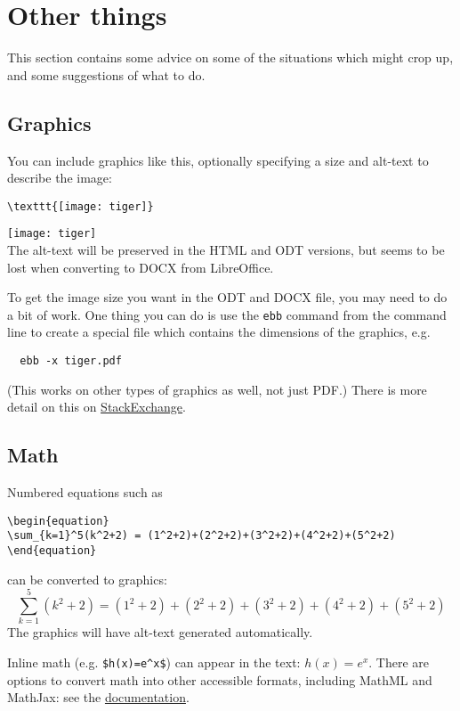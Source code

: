 \documentclass[a4paper,12pt]{article}
\begin{document}
\section{Other things}

This section contains some advice on some of the situations which
might crop up, and some suggestions of what to do.

\subsection{Graphics}

You can include graphics like this, optionally specifying a size and
alt-text to describe the image:
\begin{verbatim}
\texttt{[image: tiger]}  
\end{verbatim}
\texttt{[image: tiger]}\\
The alt-text will be preserved in the HTML and ODT versions, but seems
to be lost when converting to DOCX from LibreOffice.

To get the image size you want in the ODT and DOCX file, you may need
to do a bit of work. One thing you can do is use the \verb!ebb!
command from the command line to create a special file which contains
the dimensions of the graphics, e.g.
\begin{verbatim}
  ebb -x tiger.pdf
\end{verbatim}
(This works on other types of graphics as well, not just PDF.)  There
is more detail on this on
\href{https://tex.stackexchange.com/a/568853/110494}{StackExchange}.

\subsection{Math}

Numbered equations such as
\begin{verbatim}
\begin{equation}
\sum_{k=1}^5(k^2+2) = (1^2+2)+(2^2+2)+(3^2+2)+(4^2+2)+(5^2+2)
\end{equation}
\end{verbatim}
can be converted to graphics:
\begin{equation}
\sum_{k=1}^5(k^2+2) = (1^2+2)+(2^2+2)+(3^2+2)+(4^2+2)+(5^2+2)
\end{equation}
The graphics will have alt-text generated automatically.

Inline math (e.g. \verb!$h(x)=e^x$!) can appear in the text:
$h(x)=e^x$.  There are options to convert math into other accessible formats,
including MathML and MathJax: see the
\href{https://www.kodymirus.cz/tex4ht-doc/BasicTutorial.html#math-options}{documentation}.
\end{document}
